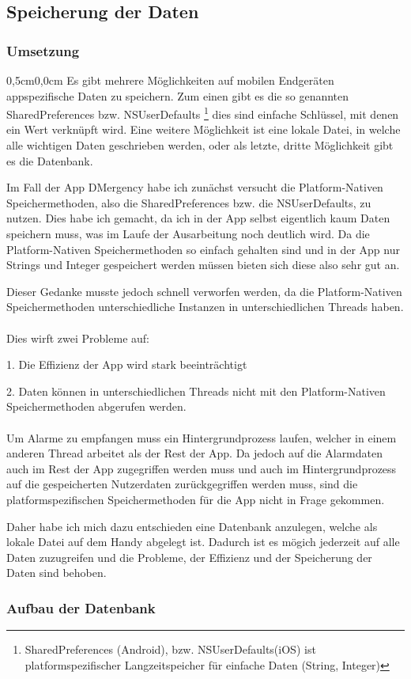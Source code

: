 \subsection{Speicherung der Daten}
\subsubsection{Umsetzung}
\begin{changemargin}{0,5cm}{0,0cm}
    Es gibt mehrere Möglichkeiten auf mobilen Endgeräten appspezifische Daten zu speichern.
    Zum einen gibt es die so genannten SharedPreferences bzw. NSUserDefaults
    \footnote{SharedPreferences (Android), bzw. NSUserDefaults(iOS) ist platformspezifischer Langzeitspeicher für einfache Daten (String, Integer)}
    dies sind einfache Schlüssel, mit denen ein Wert verknüpft wird.
    Eine weitere Möglichkeit ist eine lokale Datei, in welche alle wichtigen Daten geschrieben werden, oder als letzte, dritte Möglichkeit gibt es
    die Datenbank.

    Im Fall der App DMergency habe ich zunächst versucht die Platform-Nativen Speichermethoden, also die SharedPreferences bzw. die NSUserDefaults, zu nutzen.
    Dies habe ich gemacht, da ich in der App selbst eigentlich kaum Daten speichern muss, was im Laufe der Ausarbeitung noch deutlich wird.
    Da die Platform-Nativen Speichermethoden so einfach gehalten sind und in der App nur Strings und Integer gespeichert werden müssen bieten sich diese also sehr gut an.

    Dieser Gedanke musste jedoch schnell verworfen werden, da die Platform-Nativen Speichermethoden unterschiedliche Instanzen in unterschiedlichen Threads haben.
    \\
    \\Dies wirft zwei Probleme auf:
    \item 1. Die Effizienz der App wird stark beeinträchtigt
    \item 2. Daten können in unterschiedlichen Threads nicht mit den Platform-Nativen Speichermethoden abgerufen werden.
    \\\\Um Alarme zu empfangen muss ein Hintergrundprozess laufen, welcher in einem anderen Thread arbeitet als der Rest der App.
    Da jedoch auf die Alarmdaten auch im Rest der App zugegriffen werden muss und auch im Hintergrundprozess auf die gespeicherten Nutzerdaten zurückgegriffen werden muss, sind die
    platformspezifischen Speichermethoden für die App nicht in Frage gekommen.

    Daher habe ich mich dazu entschieden eine Datenbank anzulegen, welche als lokale Datei auf dem Handy abgelegt ist.
    Dadurch ist es mögich jederzeit auf alle Daten zuzugreifen und die Probleme, der Effizienz und der Speicherung der Daten sind behoben.
    

\end{changemargin}
\subsubsection{Aufbau der Datenbank}